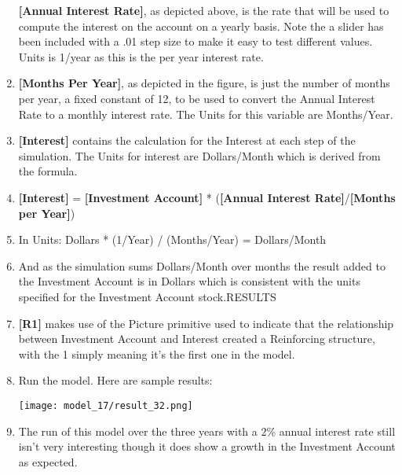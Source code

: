 \documentclass[]{memoir}
\makeatletter
\def\maxwidth{\ifdim\Gin@nat@width>\linewidth\linewidth
\else\Gin@nat@width\fi}
\let\Oldincludegraphics\includegraphics
\renewcommand{\includegraphics}[1]{\Oldincludegraphics[width=\maxwidth]{#1}}
\newcommand{\p}[1]{\textbf{{[}#1{]}}}
\makeatother
\begin{document}
\begin{oframed}
\begin{enumerate}
\p{Annual Interest Rate}, as depicted above, is the rate that will be used to compute the interest on the account on a yearly basis. Note the a slider has been included with a .01 step size to make it easy to test different values. Units is 1/year as this is the per year interest rate.


\item 

\p{Months Per Year}, as depicted in the figure, is just the number of months per year, a fixed constant of 12, to be used to convert the Annual Interest Rate to a monthly interest rate. The Units for this variable are Months/Year.


\item 

\p{Interest} contains the calculation for the Interest at each step of the simulation. The Units for interest are Dollars/Month which is derived from the formula.


\item 

\p{Interest} = \p{Investment Account} * (\p{Annual Interest Rate}/\p{Months per Year})


\item 

In Units: Dollars * (1/Year) / (Months/Year) = Dollars/Month


\item 

And as the simulation sums Dollars/Month over months the result added to the Investment Account is in Dollars which is consistent with the units specified for the Investment Account stock.RESULTS


\item 

\p{R1} makes use of the Picture primitive used to indicate that the relationship between Investment Account and Interest created a Reinforcing structure, with the 1 simply meaning it's the first one in the model.


\item Run the model. Here are sample results:\par \begin{minipage}{\linewidth}  \centering \texttt{[image: model\_17/result\_32.png]}
\end{minipage}
\item 

The run of this model over the three years with a 2\% annual interest rate still isn't very interesting though it does show a growth in the Investment Account as expected.



\end{enumerate}
\end{oframed}
\end{document}
